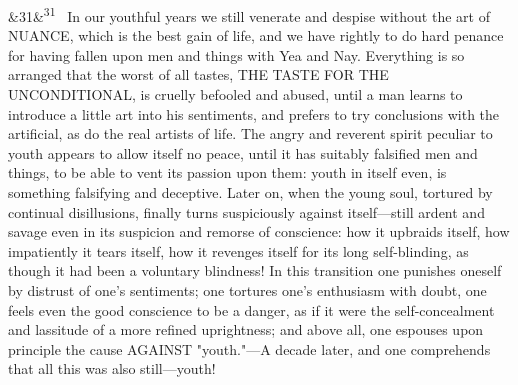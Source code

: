 \documentclass[12pt]{article}
\newcommand{\para}[1][]{\par\noindent\ifx&#1&\else\textsuperscript{\footnotesize #1}~\fi}
\begin{document}
\para[31] In our youthful years we still venerate and despise without the art of NUANCE, which is the best gain of life, and we have rightly to do hard penance for having fallen upon men and things with Yea and Nay. Everything is so arranged that the worst of all tastes, THE TASTE FOR THE UNCONDITIONAL, is cruelly befooled and abused, until a man learns to introduce a little art into his sentiments, and prefers to try conclusions with the artificial, as do the real artists of life. The angry and reverent spirit peculiar to youth appears to allow itself no peace, until it has suitably falsified men and things, to be able to vent its passion upon them: youth in itself even, is something falsifying and deceptive. Later on, when the young soul, tortured by continual disillusions, finally turns suspiciously against itself---still ardent and savage even in its suspicion and remorse of conscience: how it upbraids itself, how impatiently it tears itself, how it revenges itself for its long self-blinding, as though it had been a voluntary blindness! In this transition one punishes oneself by distrust of one's sentiments; one tortures one's enthusiasm with doubt, one feels even the good conscience to be a danger, as if it were the self-concealment and lassitude of a more refined uprightness; and above all, one espouses upon principle the cause AGAINST "youth."---A decade later, and one comprehends that all this was also still---youth!
\end{document}
